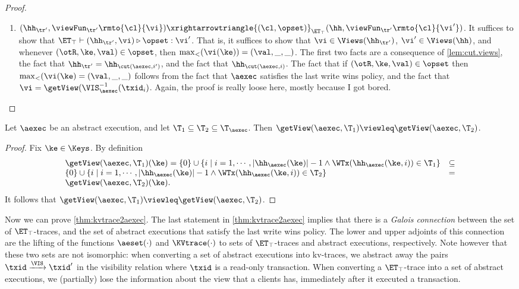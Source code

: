 \begin{proof}
\begin{itemize}
\begin{enumerate}
\item $(\hh_{\tr'}, \viewFun_{\tr'}\rmto{\cl}{\vi}) \xrightarrowtriangle{(\cl, \opset)}_{\ET_{\top}} 
(\hh,  \viewFun_{\tr'}\rmto{\cl}{\vi'})$. It suffices to show that $\ET_{\top} \vdash (\hh_{\tr'}, \vi) 
\triangleright \opset: \vi'$. That is, it suffices to show that $\vi \in \Views(\hh_{\tr'})$, 
$\vi' \in \Views(\hh)$, and whenever $(\otR, \ke, \val) \in \opset$, then 
$\max_{<}(\vi(\ke)) = (\val, \_, \_)$. The first two facts are a consequence of 
\ref{lem:cut.views}, the fact that $\hh_{\tr'} = \hh_{\cut(\aexec, i')}$, and the fact that 
$\hh_{\cut(\aexec, i)}$. The fact that if $(\otR, \ke, \val) \in \opset$ then 
$\max_{<}(\vi(\ke) = (\val, \_, \_)$ follows from the fact that $\aexec$ satisfies 
the last write wins policy, and the fact that $\vi = \getView(\VIS^{-1}_{\aexec}(\txid_{i})$.
\ac{Again, the proof is really loose here, mostly because I got bored.}
\end{enumerate} 

\end{itemize}
\end{proof}


\begin{lemma}
\label{lem:getView.monotone}
Let $\aexec$ be an abstract execution, and let $\T_1 \subseteq \T_2 \subseteq \T_{\aexec}$. 
Then $\getView(\aexec, \T_1) \viewleq \getView(\aexec, \T_2)$.
\end{lemma}
\begin{proof}
Fix $\ke \in \Keys$. By definition  
\[
\begin{array}{lr}
\getView(\aexec, \T_1)(\ke) = \{0\} \cup \{ i \mid i = 1,\cdots, \lvert \hh_{\aexec}(\ke) \rvert - 1 \wedge \WTx(\hh_{\aexec}(\ke, i)) \in \T_1\} &\subseteq\\
\{0\} \cup \{i \mid i=1,\cdots, \lvert \hh_{\aexec}(\ke) \rvert - 1 \wedge \WTx(\hh_{\aexec}(\ke, i)) \in \T_2\} & = \\
\getView(\aexec, \T_2)(\ke).
\end{array}
\]
It follows that  $\getView(\aexec, \T_1) \viewleq \getView(\aexec, \T_2)$.
\end{proof}

Now we can prove \cref{thm:kvtrace2aexec}.
The last statement in \cref{thm:kvtrace2aexec} implies that there is a \emph{Galois connection}
between the set of $\ET_{\top}$-traces, and the set of abstract executions that satisfy the 
last write wins policy. The lower and upper adjoints of this connection are the 
lifting of the functions $\aeset(\cdot)$ and $\KVtrace(\cdot)$ to sets of $\ET_{\top}$-traces 
and abstract executions, respectively. Note however that these two sets are not isomorphic: 
when converting a set of abstract executions into kv-traces, we abstract away the 
pairs $\txid \xrightarrow{\VIS} \txid'$ in the visibility relation where $\txid$ is a read-only 
transaction. When converting a $\ET_{\top}$-trace into a set of abstract executions, 
we (partially) lose the information about the view that a clients has, immediately after it executed a transaction.

